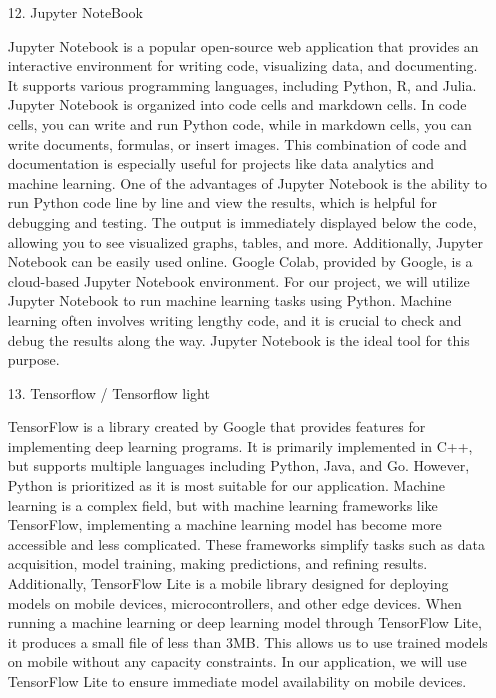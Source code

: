 \documentclass[conference, a4paper]{IEEEtran}
\begin{document}
\begin{enumerate}
\begin{enumerate}
        \item[12.]Jupyter NoteBook \cite{wikidocs-tutorial}
        \item[]Jupyter Notebook is a popular open-source web application that provides an interactive environment for writing code, visualizing data, and documenting. It supports various programming languages, including Python, R, and Julia. Jupyter Notebook is organized into code cells and markdown cells. In code cells, you can write and run Python code, while in markdown cells, you can write documents, formulas, or insert images. This combination of code and documentation is especially useful for projects like data analytics and machine learning. One of the advantages of Jupyter Notebook is the ability to run Python code line by line and view the results, which is helpful for debugging and testing. The output is immediately displayed below the code, allowing you to see visualized graphs, tables, and more. Additionally, Jupyter Notebook can be easily used online. Google Colab, provided by Google, is a cloud-based Jupyter Notebook environment. For our project, we will utilize Jupyter Notebook to run machine learning tasks using Python. Machine learning often involves writing lengthy code, and it is crucial to check and debug the results along the way. Jupyter Notebook is the ideal tool for this purpose.\\

        \item[13.]Tensorflow / Tensorflow light \cite{oracle-tensorflow}
        \item[]TensorFlow is a library created by Google that provides features for implementing deep learning programs. It is primarily implemented in C++, but supports multiple languages including Python, Java, and Go. However, Python is prioritized as it is most suitable for our application. Machine learning is a complex field, but with machine learning frameworks like TensorFlow, implementing a machine learning model has become more accessible and less complicated. These frameworks simplify tasks such as data acquisition, model training, making predictions, and refining results. Additionally, TensorFlow Lite is a mobile library designed for deploying models on mobile devices, microcontrollers, and other edge devices. When running a machine learning or deep learning model through TensorFlow Lite, it produces a small file of less than 3MB. This allows us to use trained models on mobile without any capacity constraints. In our application, we will use TensorFlow Lite to ensure immediate model availability on mobile devices.\\


\end{enumerate}
\end{enumerate}
\end{document}
